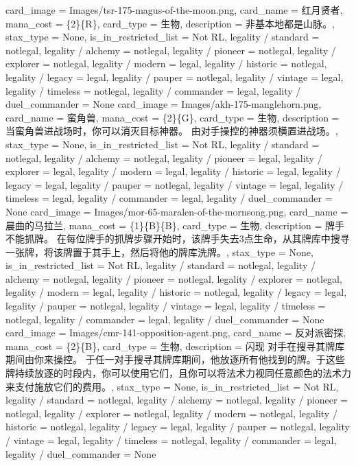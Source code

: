 \documentclass[lang = cn, color = black, 10pt]{AllThatStax}
\begin{document}
\card
{
	card_image = Images/tsr-175-magus-of-the-moon.png,
	card_name = 红月贤者,
	mana_cost = \{2\}\{R\},
	card_type = 生物,
	description = 非基本地都是山脉。,
	stax_type = None,
	is_in_restricted_list = Not RL,
	legality / standard = notlegal,
	legality / alchemy = notlegal,
	legality / pioneer = notlegal,
	legality / explorer = notlegal,
	legality / modern = legal,
	legality / historic = notlegal,
	legality / legacy = legal,
	legality / pauper = notlegal,
	legality / vintage = legal,
	legality / timeless = notlegal,
	legality / commander = legal,
	legality / duel_commander = None
}
\card
{
	card_image = Images/akh-175-manglehorn.png,
	card_name = 蛮角兽,
	mana_cost = \{2\}\{G\},
	card_type = 生物,
	description = 当蛮角兽进战场时，你可以消灭目标神器。
	由对手操控的神器须横置进战场。,
	stax_type = None,
	is_in_restricted_list = Not RL,
	legality / standard = notlegal,
	legality / alchemy = notlegal,
	legality / pioneer = legal,
	legality / explorer = legal,
	legality / modern = legal,
	legality / historic = legal,
	legality / legacy = legal,
	legality / pauper = notlegal,
	legality / vintage = legal,
	legality / timeless = legal,
	legality / commander = legal,
	legality / duel_commander = None
}
\card
{
	card_image = Images/mor-65-maralen-of-the-mornsong.png,
	card_name = 晨曲的马拉兰,
	mana_cost = \{1\}\{B\}\{B\},
	card_type = 生物,
	description = 牌手不能抓牌。
	在每位牌手的抓牌步骤开始时，该牌手失去3点生命，从其牌库中搜寻一张牌，将该牌置于其手上，然后将他的牌库洗牌。,
	stax_type = None,
	is_in_restricted_list = Not RL,
	legality / standard = notlegal,
	legality / alchemy = notlegal,
	legality / pioneer = notlegal,
	legality / explorer = notlegal,
	legality / modern = legal,
	legality / historic = notlegal,
	legality / legacy = legal,
	legality / pauper = notlegal,
	legality / vintage = legal,
	legality / timeless = notlegal,
	legality / commander = legal,
	legality / duel_commander = None
}
\card
{
	card_image = Images/cmr-141-opposition-agent.png,
	card_name = 反对派密探,
	mana_cost = \{2\}\{B\},
	card_type = 生物,
	description = 闪现
	对手在搜寻其牌库期间由你来操控。
	于任一对手搜寻其牌库期间，他放逐所有他找到的牌。于这些牌持续放逐的时段内，你可以使用它们，且你可以将法术力视同任意颜色的法术力来支付施放它们的费用。,
	stax_type = None,
	is_in_restricted_list = Not RL,
	legality / standard = notlegal,
	legality / alchemy = notlegal,
	legality / pioneer = notlegal,
	legality / explorer = notlegal,
	legality / modern = notlegal,
	legality / historic = notlegal,
	legality / legacy = legal,
	legality / pauper = notlegal,
	legality / vintage = legal,
	legality / timeless = notlegal,
	legality / commander = legal,
	legality / duel_commander = None
}
\end{document}
